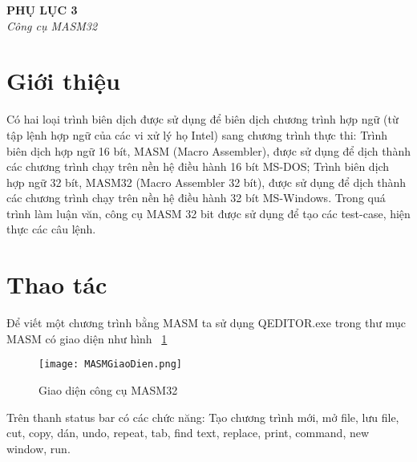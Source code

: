 \begin{center}
	\begin{huge}
			\textbf{PHỤ LỤC 3}\\
			\textit{Công cụ MASM32}
	\end{huge}
\end{center}

	\section*{Giới thiệu}
	Có hai loại trình biên dịch được sử dụng để biên dịch chương trình hợp ngữ (từ tập lệnh hợp ngữ của các vi xử lý họ Intel) sang chương trình thực thi: Trình biên dịch hợp ngữ 16 bít, MASM (Macro Assembler), được sử dụng để dịch thành các chương trình chạy trên nền hệ điều hành 16 bít MS-DOS; Trình biên dịch hợp ngữ 32 bít, MASM32 (Macro Assembler 32 bít), được sử dụng để dịch thành các chương trình chạy trên nền hệ điều hành 32 bít  MS-Windows. Trong quá trình làm luận văn, công cụ MASM 32 bit được sử dụng để tạo các test-case, hiện thực các câu lệnh.
	
	\section*{Thao tác}
	Để viết một chương trình bằng MASM ta sử dụng QEDITOR.exe trong thư mục MASM có giao diện như hình ~\ref{fig:MASM}
	\begin{center}
			\begin{figure}[htp]
				\begin{center}
					\texttt{[image: MASMGiaoDien.png]}
				\end{center}
				\caption{Giao diện công cụ MASM32}	
					\label{fig:MASM}		
			\end{figure}
		\end{center}			
	
	
	Trên thanh status bar có các chức năng: Tạo chương trình mới, mở file, lưu file, cut, copy, dán, undo, repeat, tab, find text, replace, print, command, new window, run.\\

